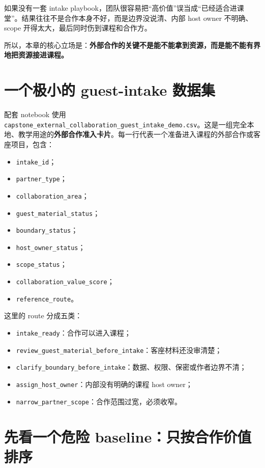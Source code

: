 如果没有一套 intake playbook，团队很容易把“高价值”误当成“已经适合进课堂”。结果往往不是合作本身不好，而是边界没说清、内部 host owner 不明确、scope 开得太大，最后同时伤到课程和合作方。

所以，本章的核心立场是：\textbf{外部合作的关键不是能不能拿到资源，而是能不能有界地把资源接进课程。}

\section{一个极小的 guest-intake 数据集}

配套 notebook 使用 \nolinkurl{capstone_external_collaboration_guest_intake_demo.csv}。这是一组完全本地、教学用途的\textbf{外部合作准入卡片}。每一行代表一个准备进入课程的外部合作或客座项目，包含：

\begin{itemize}
    \item \texttt{intake\_id}；
    \item \texttt{partner\_type}；
    \item \texttt{collaboration\_area}；
    \item \texttt{guest\_material\_status}；
    \item \texttt{boundary\_status}；
    \item \texttt{host\_owner\_status}；
    \item \texttt{scope\_status}；
    \item \texttt{collaboration\_value\_score}；
    \item \texttt{reference\_route}。
\end{itemize}

这里的 route 分成五类：

\begin{itemize}
    \item \texttt{intake\_ready}：合作可以进入课程；
    \item \texttt{review\_guest\_material\_before\_intake}：客座材料还没审清楚；
    \item \texttt{clarify\_boundary\_before\_intake}：数据、权限、保密或作者边界不清；
    \item \texttt{assign\_host\_owner}：内部没有明确的课程 host owner；
    \item \texttt{narrow\_partner\_scope}：合作范围过宽，必须收窄。
\end{itemize}

\section{先看一个危险 baseline：只按合作价值排序}

